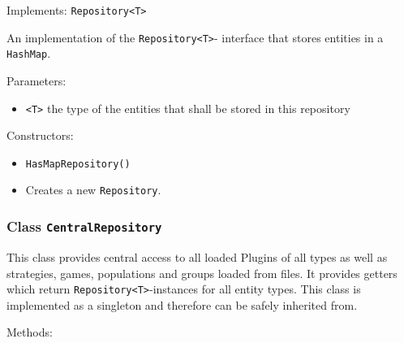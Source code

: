 \documentclass[parskip=full,11pt]{scrartcl}
\begin{document}
Implements: \texttt{Repository<T>}

An implementation of the \texttt{Repository<T>}- interface that stores entities in a \texttt{HashMap}.

Parameters:

\begin{itemize}\itemsep -10pt
	\item \texttt{<T>} the type of the entities that shall be stored in this repository
\end{itemize}

Constructors:

\begin{itemize} \itemsep -10pt
	\item \texttt{HasMapRepository()}
	\item[] Creates a new \texttt{Repository}.
\end{itemize}

\subsubsection{Class \texttt{CentralRepository}}

This class provides central access to all loaded Plugins of all types as well as strategies, games, populations and groups loaded from files. It provides getters which return \texttt{Repository<T>}-instances for all entity types. This class is implemented as a singleton and therefore can be safely inherited from.

Methods:
\end{document}
